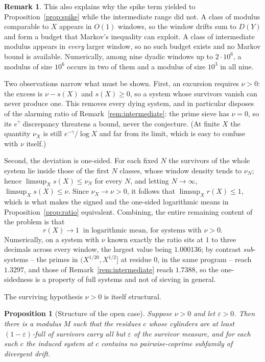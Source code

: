 \documentclass[11pt]{article}
\theoremstyle{plain}
\newtheorem{proposition}[theorem]{Proposition}
\theoremstyle{definition}
\newtheorem{remark}[theorem]{Remark}
\begin{document}
\begin{remark}\label{rem:ratiowin}
This also explains why the spike term yielded to
Proposition~\ref{prop:spike} while the intermediate range did
not.  A class of modulus comparable to $X$ appears in $O(1)$
windows, so the window drifts sum to $D(Y)$ and form a budget
that Markov's inequality can exploit.  A class of intermediate
modulus appears in \emph{every} larger window, so no such budget
exists and no Markov bound is available.  Numerically, among
nine dyadic windows up to $2\cdot10^6$, a modulus of size
$10^6$ occurs in two of them and a modulus of size $10^3$ in all
nine.

Two observations narrow what must be shown.  First, an
excursion requires $\nu>0$: the excess is $\nu-s(X)$ and
$s(X)\ge0$, so a system whose survivors vanish can never
produce one.  This removes every dying system, and in particular
disposes of the alarming ratio of
Remark~\ref{rem:intermediate}: the prime sieve has $\nu=0$, so
its $e^{\gamma}$ discrepancy threatens a bound, never the
conjecture.  (At finite $X$ the quantity $\nu_X$ is still
$e^{-\gamma}/\log X$ and far from its limit, which is easy to
confuse with $\nu$ itself.)

Second, the deviation is one-sided.  For each fixed $N$ the
survivors of the whole system lie inside those of the first $N$
classes, whose window density tends to $\nu_N$; hence
$\limsup_Xs(X)\le\nu_N$ for every $N$, and letting $N\to\infty$,
$\limsup_Xs(X)\le\nu$.  Since $\nu_X\to\nu>0$, it follows that
$\limsup_Xr(X)\le1$, which is what makes the signed and the
one-sided logarithmic means in Proposition~\ref{prop:ratio}
equivalent.  Combining,
the entire remaining content of the problem is that
\[
  r(X)\to1\ \text{ in logarithmic mean, for systems with }\nu>0 .
\]
Numerically, on a system with $\nu$ known exactly the ratio sits
at $1$ to three decimals across every window, the largest value
being $1.000136$; by contrast \emph{sub}-systems -- the primes in
$(X^{1/20},X^{1/2}]$ at residue $0$, in the same program -- reach
$1.3297$, and those of Remark~\ref{rem:intermediate} reach
$1.7388$, so the
one-sidedness is a property of full systems and not of
sieving in general.

The surviving hypothesis $\nu>0$ is itself structural.

\begin{proposition}[Structure of the open case]\label{prop:goodcyl}
Suppose $\nu>0$ and let $\varepsilon>0$.  Then there is a
modulus $M$ such that the residues $c$ whose cylinders are at
least $(1-\varepsilon)$-full of survivors carry all but
$\varepsilon$ of the survivor measure, and for each such $c$ the
induced system at $c$ contains \emph{no} pairwise-coprime
subfamily of divergent drift.
\end{proposition}


\end{remark}
\end{document}
